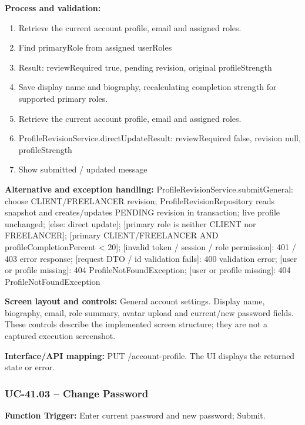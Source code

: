 \textbf{Process and validation:}
\begin{enumerate}
\item Retrieve the current account profile, email and assigned roles.
\item Find primary\allowbreak{}Role from assigned user\allowbreak{}Roles
\item Result: review\allowbreak{}Required true, pending revision, original profile\allowbreak{}Strength
\item Save display name and biography, recalculating completion strength for supported primary roles.
\item Retrieve the current account profile, email and assigned roles.
\item Profile\allowbreak{}Revision\allowbreak{}Service.direct\allowbreak{}Update\allowbreak{}Result: review\allowbreak{}Required false, revision null, profile\allowbreak{}Strength
\item Show submitted /\allowbreak{} updated message
\end{enumerate}
\textbf{Alternative and exception handling:} Profile\allowbreak{}Revision\allowbreak{}Service.submit\allowbreak{}General: choose CLIENT/\allowbreak{}FREELANCER revision; Profile\allowbreak{}Revision\allowbreak{}Repository reads snapshot and creates/\allowbreak{}updates PENDING revision in transaction; live profile unchanged; [else: direct update]; [primary role is neither CLIENT nor FREELANCER]; [primary CLIENT/\allowbreak{}FREELANCER AND profile\allowbreak{}Completion\allowbreak{}Percent < 20]; [invalid token /\allowbreak{} session /\allowbreak{} role permission]: 401 /\allowbreak{} 403 error response; [request DTO /\allowbreak{} id validation fails]: 400 validation error; [user or profile missing]: 404 Profile\allowbreak{}Not\allowbreak{}Found\allowbreak{}Exception; [user or profile missing]: 404 Profile\allowbreak{}Not\allowbreak{}Found\allowbreak{}Exception

\textbf{Screen layout and controls:} General account settings. Display name, biography, email, role summary, avatar upload and current/\allowbreak{}new password fields. These controls describe the implemented screen structure; they are not a captured execution screenshot.

\textbf{Interface/\allowbreak{}API mapping:} PUT /\allowbreak{}account-profile. The UI displays the returned state or error.

\subsubsection{UC-41.03 -- Change Password}
\textbf{Function Trigger:} Enter current password and new password; Submit.

